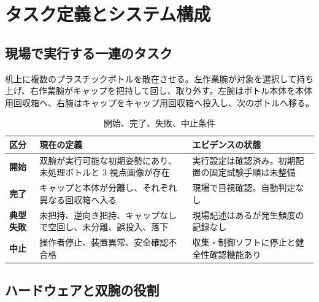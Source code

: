 \chapter{タスク定義とシステム構成}

\section{現場で実行する一連のタスク}

机上に複数のプラスチックボトルを散在させる。左作業腕が対象を選択して持ち上げ、右作業腕がキャップを把持して回し、取り外す。左腕はボトル本体を本体用回収箱へ、右腕はキャップをキャップ用回収箱へ投入し、次のボトルへ移る。

\begin{table}[H]
\centering
\small
\caption{開始、完了、失敗、中止条件}
\begin{tabularx}{\textwidth}{>{\japanesesans\bfseries}p{23mm}X p{43mm}}
\toprule
区分 & 現在の定義 & エビデンスの状態\\
\midrule
開始 & 双腕が実行可能な初期姿勢にあり、未処理ボトルと 3 視点画像が存在 & 実行設定は確認済み。初期配置の固定試験手順は未整備\\
完了 & キャップと本体が分離し、それぞれ異なる回収箱へ入る & 現場で目視確認。自動判定なし\\
典型失敗 & 未把持、逆向き把持、キャップなしで空回し、未分離、誤投入、落下 & 現場記述はあるが発生頻度の記録なし\\
中止 & 操作者停止、装置異常、安全確認不合格 & 収集・制御ソフトに停止と健全性確認機能あり\\
\bottomrule
\end{tabularx}
\end{table}

\section{ハードウェアと双腕の役割}

